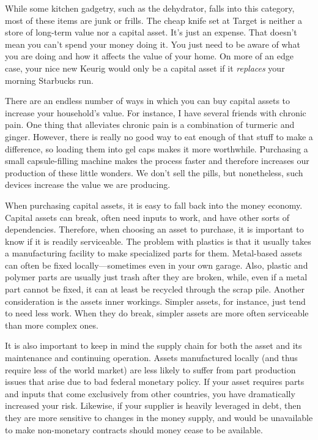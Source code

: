 While some kitchen
gadgetry, such as the
dehydrator, falls into this category, most of these items are junk or
frills. The cheap knife set at Target is neither a store of long-term
value nor a capital asset. It’s just an expense. That doesn’t mean you
can’t spend your money doing it. You just need to be aware of what you
are doing and how it affects the value of your home. On more of an edge
case, your nice new Keurig would only be a capital asset if it
\textit{replaces} your morning Starbucks run.

There are an endless
number of ways in which you can buy capital assets to increase your
household’s value. For instance, I have several friends with chronic
pain. One thing that alleviates chronic pain is a combination of
turmeric and ginger. However, there is really no good way to eat enough
of that stuff to make a difference, so loading them into gel caps makes
it more worthwhile. Purchasing a small capsule-filling machine makes
the process faster and therefore increases our production of these
little wonders. We don’t sell the pills, but nonetheless, such devices
increase the value we are producing.

When purchasing capital assets, it is easy to fall back into the money
economy. Capital assets can break, often need inputs to work, and have
other sorts of dependencies. Therefore, when choosing an asset to
purchase, it is important to know if it is readily serviceable. The
problem with plastics is that it usually takes a manufacturing facility
to make specialized parts for them. Metal-based assets can often be
fixed locally—sometimes even in your own garage. Also, plastic and
polymer parts are usually just trash after they are broken, while, even
if a metal part cannot be fixed, it can at least be recycled through
the scrap pile.  Another consideration is the asset{\textquotesingle}s
inner workings.  Simpler assets, for instance, just tend to need less
work.  When they do break, simpler assets are more often serviceable
than more complex ones.  

It is also important to keep in mind the supply chain for both the asset
and its maintenance and continuing operation.  Assets manufactured
locally (and thus require less of the world market) are less likely to
suffer from part production issues that arise due to bad federal
monetary policy.  If your asset requires parts and inputs that come
exclusively from other countries, you have dramatically increased your
risk.  Likewise, if your supplier is heavily leveraged in debt, then
they are more sensitive to changes in the money supply, and would be
unavailable to make non-monetary contracts should money cease to be
available.  

